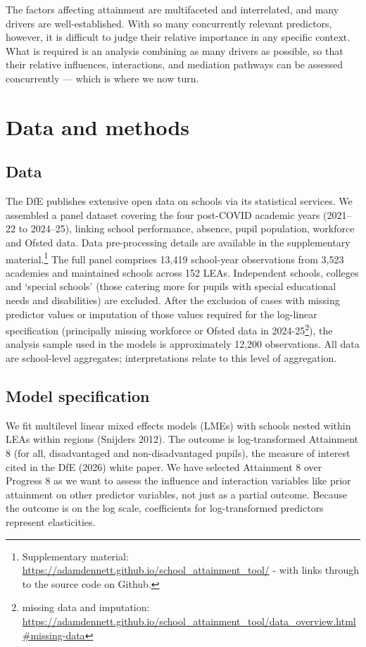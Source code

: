 \documentclass[
  12pt,
  titlepage]{article}
\begin{document}
The factors affecting attainment are multifaceted and interrelated, and
many drivers are well-established. With so many concurrently relevant
predictors, however, it is difficult to judge their relative importance
in any specific context. What is required is an analysis combining as
many drivers as possible, so that their relative influences,
interactions, and mediation pathways can be assessed concurrently ---
which is where we now turn.

\section{Data and methods}\label{data-and-methods}

\subsection{Data}\label{data}

The DfE publishes extensive open data on schools via its statistical
services. We assembled a panel dataset covering the four post-COVID
academic years (2021--22 to 2024--25), linking school performance,
absence, pupil population, workforce and Ofsted data. Data
pre-processing details are available in the supplementary
material.\footnote{Supplementary material:
  \url{https://adamdennett.github.io/school_attainment_tool/} - with
  links through to the source code on Github.} The full panel comprises
13,419 school-year observations from 3,523 academies and maintained
schools across 152 LEAs. Independent schools, colleges and `special
schools' (those catering more for pupils with special educational needs
and disabilities) are excluded. After the exclusion of cases with
missing predictor values or imputation of those values required for the
log-linear specification (principally missing workforce or Ofsted data
in 2024-25\footnote{missing data and imputation:
  \url{https://adamdennett.github.io/school_attainment_tool/data_overview.html\#missing-data}}),
the analysis sample used in the models is approximately 12,200
observations. All data are school-level aggregates; interpretations
relate to this level of aggregation.

\subsection{Model specification}\label{model-specification}

We fit multilevel linear mixed effects models (LMEs) with schools nested
within LEAs within regions (Snijders 2012). The outcome is
log-transformed Attainment 8 (for all, disadvantaged and
non-disadvantaged pupils), the measure of interest cited in the DfE
(2026) white paper. We have selected Attainment 8 over Progress 8 as we
want to assess the influence and interaction variables like prior
attainment on other predictor variables, not just as a partial outcome.
Because the outcome is on the log scale, coefficients for
log-transformed predictors represent elasticities.
\end{document}
